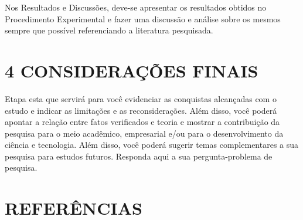 \documentclass[
]{article}
\begin{document}
Nos Resultados e Discussões, deve-se apresentar os resultados obtidos no
Procedimento Experimental e fazer uma discussão e análise sobre os
mesmos sempre que possível referenciando a literatura pesquisada.

\section{4 CONSIDERAÇÕES FINAIS}\label{considerauxe7uxf5es-finais}

Etapa esta que servirá para você evidenciar as conquistas alcançadas com
o estudo e indicar as limitações e as reconsiderações. Além disso, você
poderá apontar a relação entre fatos verificados e teoria e mostrar a
contribuição da pesquisa para o meio acadêmico, empresarial e/ou para o
desenvolvimento da ciência e tecnologia. Além disso, você poderá sugerir
temas complementares a sua pesquisa para estudos futuros. Responda aqui
a sua pergunta-problema de pesquisa.

\section*{REFERÊNCIAS}\label{referuxeancias}
\end{document}
